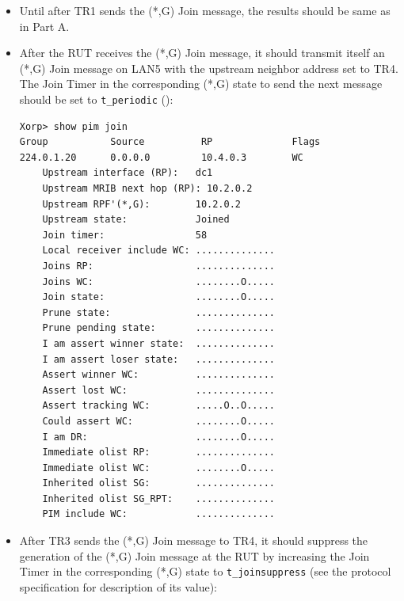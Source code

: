 \documentclass[11pt]{report}
\begin{document}
\begin{itemize}

  \item Until after TR1 sends the (*,G) Join message, the results should be
  same as in Part A.

  \item After the RUT receives the (*,G) Join message, it should
  transmit itself an (*,G) Join message on LAN5 with the upstream
  neighbor address set to TR4. The Join Timer in the corresponding (*,G)
  state to send the next message should be set to \verb=t_periodic=
  ({\PimsmTPeriodic}):

\begin{verbatim}
Xorp> show pim join 
Group           Source          RP              Flags
224.0.1.20      0.0.0.0         10.4.0.3        WC   
    Upstream interface (RP):   dc1
    Upstream MRIB next hop (RP): 10.2.0.2
    Upstream RPF'(*,G):        10.2.0.2
    Upstream state:            Joined 
    Join timer:                58
    Local receiver include WC: ..............
    Joins RP:                  ..............
    Joins WC:                  ........O.....
    Join state:                ........O.....
    Prune state:               ..............
    Prune pending state:       ..............
    I am assert winner state:  ..............
    I am assert loser state:   ..............
    Assert winner WC:          ..............
    Assert lost WC:            ..............
    Assert tracking WC:        .....O..O.....
    Could assert WC:           ........O.....
    I am DR:                   ........O.....
    Immediate olist RP:        ..............
    Immediate olist WC:        ........O.....
    Inherited olist SG:        ..............
    Inherited olist SG_RPT:    ..............
    PIM include WC:            ..............
\end{verbatim}

  \item After TR3 sends the (*,G) Join message to TR4, it should suppress
  the generation of the (*,G) Join message at the RUT by increasing the
  Join Timer in the corresponding (*,G) state to \verb=t_joinsuppress=
  (see the protocol specification for description of its value):


\end{itemize}
\end{document}
